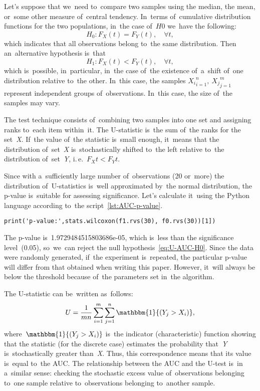 \documentclass[]{scrreprt}
\begin{document}
Let's suppose that we~need to~compare two samples using the median, the mean, or~some other measure of~central tendency. In~terms of~cumulative distribution functions for the two populations, in~the case of~$H0$ we~have the following:
\begin{equation}\label{eq:U-AUC-H0}
H_0: F_{X}(t) = F_{Y}(t), \quad \forall t,
\end{equation}
which indicates that all observations belong to~the same distribution. Then an~alternative hypothesis is~that
\begin{equation}\label{eq:U-AUC-H1}
H_1: F_{X}(t) < F_{Y}(t), \quad \forall t,
\end{equation}
which is~possible, in~particular, in~the case of~the existence of~a~shift of~one distribution relative to~the other. In~this case, the samples ${X_{i}}_{i=1}^{n},\ {X_{j}}_{j=1}^{m}$ represent independent groups of~observations. In~this case, the size of~the samples may vary.

The test technique consists of~combining two samples into one set and assigning ranks to~each item within~it. The U-statistic is~the sum of~the ranks for the set~\textit{X}. If~the value of~the statistic is~small enough, it~means that the distribution of~set~\textit{X} is~stochastically shifted to~the left relative to~the distribution of~set~\textit{Y}, i.\,e.~$F_{X}{t} < F_{Y}{t}$.

Since with a~sufficiently large number of~observations (20 or~more) the distribution of~U-statistics is~well approximated by~the normal distribution, the p-value is~suitable for assessing significance. Let's calculate it~using the Python language according to~the script~\ref{lst:AUC-p-value}.
%
\begin{lstlisting}[float, caption = Calculation of~the p-value for the test data, firstnumber=1, label= lst:AUC-p-value]
print('p-value:',stats.wilcoxon(f1.rvs(30), f0.rvs(30))[1])

\end{lstlisting}
The p-value is~1.9729484515803686e-05, which is~less than the significance level~(0.05), so~we~can reject the null hypothesis~\ref{eq:U-AUC-H0}. Since the data were randomly generated, if~the experiment is~repeated, the particular p-value will differ from that obtained when writing this paper. However, it~will always be below the threshold because of~the parameters set in~the algorithm.

The U-statistic can be~written as~follows:
\begin{equation}\label{eq:U-statistics}
U = \frac{1}{mn}\sum_{i=1}^{m}\sum_{j=1}^{n}\mathbbm{1}{(Y_{j}>X_{i})},
\end{equation}
where~$\mathbbm{1}{(Y_{j}>X_{i})}$ is~the indicator (characteristic) function showing that the statistic (for the discrete case) estimates the probability that~\textit{Y} is~stochastically greater than~\textit{X}. Thus, this correspondence means that its value is~equal to~the AUC. The relationship between the AUC and the U-test is~in a~similar sense: checking the stochastic excess value of~observations belonging to~one sample relative to~observations belonging to~another sample.
%
\end{document}
